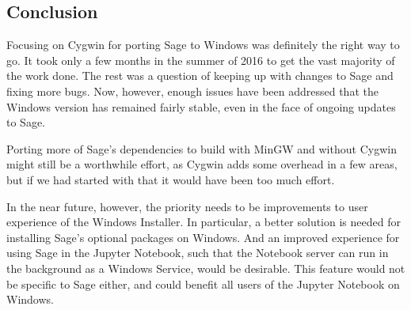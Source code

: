 \hypertarget{conclusion}{%
\subsection{Conclusion}\label{conclusion}}

Focusing on Cygwin for porting Sage to Windows was definitely the right
way to go. It took only a few months in the summer of 2016 to get the
vast majority of the work done. The rest was a question of keeping
up with changes to Sage and fixing more bugs. Now, however, enough
issues have been addressed that the Windows version has remained fairly
stable, even in the face of ongoing updates to Sage.

Porting more of Sage's dependencies to build with MinGW and without
Cygwin might still be a worthwhile effort, as Cygwin adds some overhead
in a few areas, but if we had started with that it would have been too
much effort.

In the near future, however, the priority needs to be improvements to
user experience of the Windows Installer. In particular, a better
solution is needed for installing Sage's optional packages on Windows.
And an improved experience for using Sage in the Jupyter Notebook, such
that the Notebook server can run in the background as a Windows Service,
would be desirable. This feature would not be specific to Sage either, and
could benefit all users of the Jupyter Notebook on Windows.
